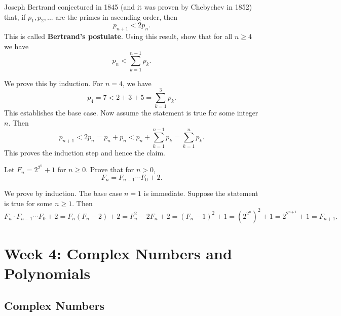 \documentclass[11pt,dvipsnames]{book}
\numberwithin{equation}{section} %
\numberwithin{figure}{section} %
\numberwithin{table}{section} %
\begin{document}
\begin{exercise} Joseph Bertrand conjectured in 1845 (and it was proven by Chebychev in 1852) that, if $p_{1},p_{2},...$ are the primes in ascending order, then
\[
p_{n+1}<2p_{n}.
\]
This is called {\bf Bertrand's postulate}. Using this result, show that for all $n\geq 4$ we have 
\[
p_{n} <\sum_{k=1}^{n-1} p_{k}.
\]

\end{exercise}

\begin{solution}

We prove this by induction. For $n=4$, we have 
\[
p_{4}=7 < 2+3+5 = \sum_{k=1}^{3} p_{k}.
\]
This establishes the base case. Now assume the statement is true for some integer $n$. Then
\[
p_{n+1}<2p_{n} = p_{n}+p_{n} < p_{n}+\sum_{k=1}^{n-1} p_{k} = \sum_{k=1}^{n} p_{k}.
\]
This proves the induction step and hence the claim. 



\end{solution}


\begin{exercise} Let $F_{n}=2^{2^{n}}+1$ for $n\geq 0$. Prove that for $n>0$,
\[
F_{n} = F_{n-1}\cdots F_{0}+2.
\]
\end{exercise}

\begin{solution}
We prove by induction. The base case $n=1$ is immediate. Suppose the statement is true for some $n\geq 1$. Then
\[
F_{n}\cdot F_{n-1}\cdots F_{0}+2
= F_{n}(F_{n}-2)+2 
=F_{n}^{2}-2F_{n}+2
=(F_{n}-1)^2+1
=(2^{2^{n}})^2+1 = 2^{2^{n+1}}+1 =F_{n+1}.
\]

\end{solution}







\part{Week 4: Complex Numbers and Polynomials}





\chapter{Complex Numbers}
\end{document}
